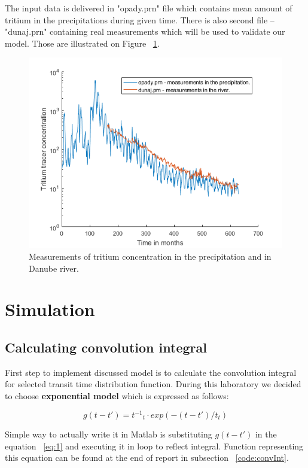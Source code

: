 \documentclass[12pt]{article}
\begin{document}
The input data is delivered in "opady.prn" file which contains mean amount of tritium in the precipitations during given time. There is also second file -- "dunaj.prn" containing real measurements which will be used to validate our model. Those are illustrated on Figure ~\ref{dane}.

\begin{figure}[H]
	\centering
	\includegraphics[width=\textwidth]{dane}
	\caption{Measurements of tritium concentration in the precipitation and in Danube river.}    
	\label{dane}
\end{figure}

\section{Simulation}

\subsection{Calculating convolution integral}
First step to implement discussed model is to calculate the convolution integral for selected transit time distribution function. During this laboratory we decided to choose \textbf{exponential model} which is expressed as follows:

\begin{equation}
g(t - t') = {t^{-1}}_t \cdot exp(-(t - t')/t_t)
\end{equation}

Simple way to actually write it in Matlab is substituting $g(t - t')$ in the equation ~\ref{eq:1} and executing it in loop to reflect integral. Function representing this equation can be found at the end of report in subsection ~\ref{code:convInt}. 
\end{document}
